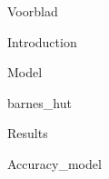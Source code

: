 \documentclass{article}
\begin{document}
{Voorblad}
\newpage

\tableofcontents
\newpage

{Introduction}
\newpage

{Model}
\newpage
 
{barnes_hut}
\newpage

{Results}
\newpage

{Accuracy_model}
\newpage


\newpage


\newpage


\end{document}
